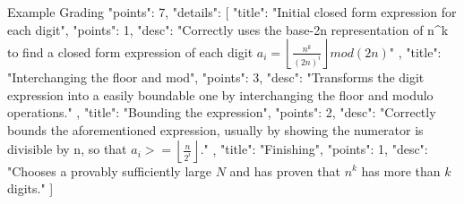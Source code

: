 \begin{prompt}{Example Grading}
{
    "points": 7,
    "details": [
        {
            "title": "Initial closed form expression for each digit",
            "points": 1,
            "desc": "Correctly uses the base-2n representation of n^k to find a closed form expression of each digit $a_i=\left\lfloor \frac{n^k}{(2n)^i}\right\rfloor mod (2n)$"
        },
        {
            "title": "Interchanging the floor and mod",
            "points": 3,
            "desc": "Transforms the digit expression into a easily boundable one by interchanging the floor and modulo operations."
        },
        {
            "title": "Bounding the expression",
            "points": 2,
            "desc": "Correctly bounds the aforementioned expression, usually by showing the numerator is divisible by n, so that $a_i>=\left\lfloor \frac{n}{2^i}\right\rfloor$."
        },
        {
            "title": "Finishing",
            "points": 1,
            "desc": "Chooses a provably sufficiently large $N$ and has proven that $n^k$ has more than $k$ digits."
        }
    ]
}
\end{prompt}